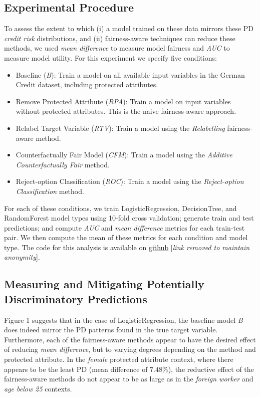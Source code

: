 \documentclass{interact}
\begin{document}
\subsection{Experimental Procedure}

To assess the extent to which (i) a model trained on these data mirrors these PD
\emph{credit risk} distributions, and (ii) fairness-aware techniques can reduce
these methods, we used \emph{mean difference} to measure model fairness and
\emph{AUC} to measure model utility. For this experiment we specify five
conditions:

\begin{itemize}
  \item Baseline (\emph{B}): Train a model on all available input variables in
        the German Credit dataset, including protected attributes.
  \item Remove Protected Attribute (\emph{RPA}): Train a model on input variables
        without protected attributes. This is the naive fairness-aware approach.
  \item Relabel Target Variable (\emph{RTV}): Train a model using the
        \emph{Relabelling} fairness-aware method.
  \item Counterfactually Fair Model (\emph{CFM}): Train a model using the
        \emph{Additive Counterfactually Fair} method.
  \item Reject-option Classification (\emph{ROC}): Train a model using the
        \emph{Reject-option Classification} method.
\end{itemize}

For each of these conditions, we train LogisticRegression, DecisionTree, and
RandomForest model types using 10-fold cross validation; generate train and test
predictions; and compute \emph{AUC} and \emph{mean difference} metrics for each
train-test pair. We then compute the mean of these metrics for each condition and
model type. The code for this analysis is available on
\underline{github} [\emph{link removed to maintain anonymity}].

\subsection{Measuring and Mitigating Potentially Discriminatory Predictions}

Figure 1 suggests that in the case of LogisticRegression, the baseline model
\emph{B} does indeed mirror the PD patterns found in the true target variable.
Furthermore, each of the fairness-aware methods appear to have the desired
effect of reducing \emph{mean difference}, but to varying degrees depending on
the method and protected attribute. In the \emph{female} protected attribute
context, where there appears to be the least PD (mean difference of \(7.48\%\)),
the reductive effect of the fairness-aware methods do not appear to be as
large as in the \emph{foreign worker} and \emph{age below 25} contexts.
\end{document}

